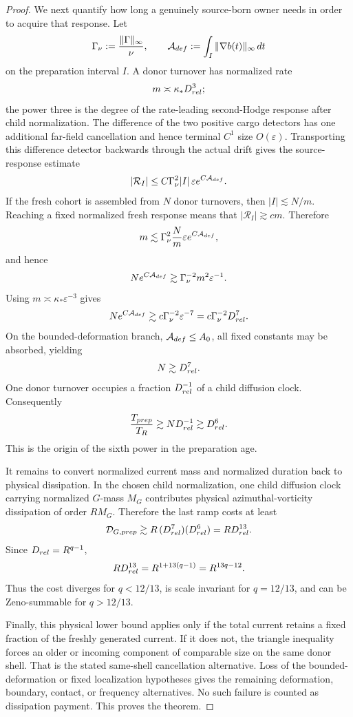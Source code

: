 \documentclass[10pt,a4paper]{amsart}
\begin{document}
\begin{proof}
We next quantify how long a genuinely source-born owner needs in order to
acquire that response.  Let
\[
 \Gamma_\nu:=\frac{\|\Gamma\|_\infty}{\nu},
 \qquad
 \mathcal A_{\rm def}:=\int_I\|\nabla b(t)\|_\infty\,dt
\]
on the preparation interval $I$.  A donor turnover has normalized rate
\[
 m\asymp \kappa_*D_{\rm rel}^{3};
\]
the power three is the degree of the rate-leading second-Hodge response after
child normalization.  The difference of the two positive cargo detectors has
one additional far-field cancellation and hence terminal $C^1$ size
$O(\varepsilon)$.  Transporting this difference detector backwards through the
actual drift gives the source-response estimate
\[
 |\mathcal R_I|
 \le C\Gamma_\nu^2|I|\,\varepsilon
 e^{C\mathcal A_{\rm def}}.
\]
If the fresh cohort is assembled from $N$ donor turnovers, then
$|I|\lesssim N/m$.  Reaching a fixed normalized fresh response means that
$|\mathcal R_I|\gtrsim c m$.  Therefore
\[
 m
 \lesssim
 \Gamma_\nu^2\frac{N}{m}\varepsilon e^{C\mathcal A_{\rm def}},
\]
and hence
\[
 N e^{C\mathcal A_{\rm def}}
 \gtrsim
 \Gamma_\nu^{-2}m^2\varepsilon^{-1}.
\]
Using $m\asymp\kappa_*\varepsilon^{-3}$ gives
\[
 N e^{C\mathcal A_{\rm def}}
 \gtrsim c\Gamma_\nu^{-2}\varepsilon^{-7}
 =c\Gamma_\nu^{-2}D_{\rm rel}^7.
\]
On the bounded-deformation branch, $\mathcal A_{\rm def}\le A_0$, all fixed
constants may be absorbed, yielding
\[
 N\gtrsim D_{\rm rel}^7.
\]
One donor turnover occupies a fraction $D_{\rm rel}^{-1}$ of a child diffusion
clock.  Consequently
\[
 \frac{T_{\rm prep}}{T_R}
 \gtrsim ND_{\rm rel}^{-1}
 \gtrsim D_{\rm rel}^{6}.
\]
This is the origin of the sixth power in the preparation age.

It remains to convert normalized current mass and normalized duration back to
physical dissipation.  In the chosen child normalization, one child diffusion
clock carrying normalized $G$-mass $M_G$ contributes physical
azimuthal-vorticity dissipation of order $R M_G$.  Therefore the last ramp
costs at least
\[
 \mathcal D_{G,\rm prep}
 \gtrsim
 R\,(D_{\rm rel}^7)(D_{\rm rel}^6)
 =R D_{\rm rel}^{13}.
\]
Since $D_{\rm rel}=R^{q-1}$,
\[
 R D_{\rm rel}^{13}
 =R^{1+13(q-1)}
 =R^{13q-12}.
\]
Thus the cost diverges for $q<12/13$, is scale invariant for $q=12/13$, and
can be Zeno-summable for $q>12/13$.

Finally, this physical lower bound applies only if the total current retains a
fixed fraction of the freshly generated current.  If it does not, the triangle
inequality forces an older or incoming component of comparable size on the
same donor shell.  That is the stated same-shell cancellation alternative.
Loss of the bounded-deformation or fixed localization hypotheses gives the
remaining deformation, boundary, contact, or frequency alternatives.  No such
failure is counted as dissipation payment.  This proves the theorem.
\end{proof}
\end{document}

